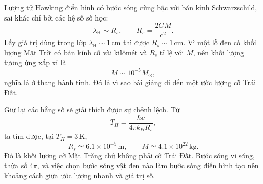 \begin{classroomqa}
\end{classroomqa}

Lượng tử Hawking điển hình có bước sóng cùng bậc với bán kính Schwarzschild, sai khác chỉ bởi các hệ số số học:
\begin{equation}
\lambda_{\mathrm{H}}\sim R_s,
\qquad
R_s=\frac{2GM}{c^2}.
\label{eq:l05-scale}
\end{equation}
Lấy giá trị dùng trong lớp \(\lambda_{\mathrm H}\sim1\,\mathrm{cm}\) thì được \(R_s\sim1\,\mathrm{cm}\). Vì một lỗ đen có khối lượng Mặt Trời có bán kính cỡ vài kilômét và \(R_s\) tỉ lệ với \(M\), nên khối lượng tương ứng xấp xỉ là
\begin{equation}
M\sim10^{-5}M_\odot,
\label{eq:l05-rough-mass}
\end{equation}
nghĩa là ở thang hành tinh. Đó là vì sao bài giảng đi đến một ước lượng cỡ Trái Đất.

\begin{classroomqa}
\end{classroomqa}

Giữ lại các hằng số sẽ giải thích được sự chênh lệch. Từ
\begin{equation}
T_H=\frac{\hbar c}{4\pi k_B R_s},
\end{equation}
ta tìm được, tại \(T_H=3\,\mathrm{K}\),
\begin{equation}
R_s\simeq6.1\times10^{-5}\,\mathrm{m},
\qquad
M\simeq4.1\times10^{22}\,\mathrm{kg}.
\label{eq:l05-three-kelvin}
\end{equation}
Đó là khối lượng cỡ Mặt Trăng chứ không phải cỡ Trái Đất. Bước sóng vi sóng, thừa số \(4\pi\), và việc chọn bước sóng vật đen nào làm bước sóng điển hình tạo nên khoảng cách giữa ước lượng nhanh và giá trị số.

